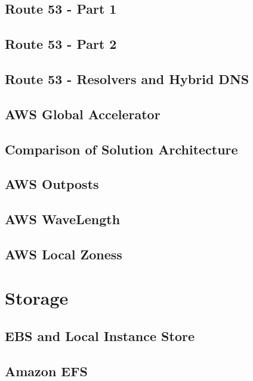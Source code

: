 \documentclass[11pt]{book}
\begin{document}
    \section{Route 53 - Part 1}


    \section{Route 53 - Part 2}


    \section{Route 53 - Resolvers and Hybrid DNS}


    \section{AWS Global Accelerator}


    \section{Comparison of Solution Architecture}


    \section{AWS Outposts}


    \section{AWS WaveLength}


    \section{AWS Local Zoness}


    \chapter{Storage}


    \section{EBS and Local Instance Store}


    \section{Amazon EFS}
\end{document}
